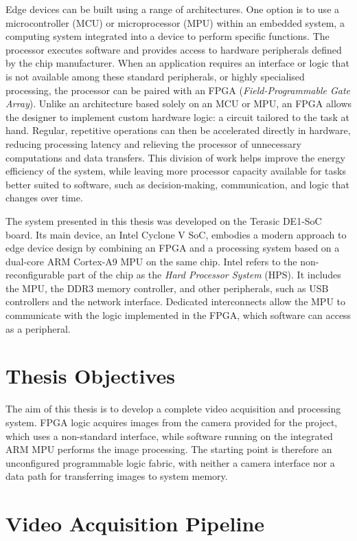 Edge devices can be built using a range of architectures. One option is to use a microcontroller (MCU) or microprocessor (MPU) within an embedded system, a computing system integrated into a device to perform specific functions. The processor executes software and provides access to hardware peripherals defined by the chip manufacturer. When an application requires an interface or logic that is not available among these standard peripherals, or highly specialised processing, the processor can be paired with an FPGA (\emph{Field-Programmable Gate Array}). Unlike an architecture based solely on an MCU or MPU, an FPGA allows the designer to implement custom hardware logic: a circuit tailored to the task at hand. Regular, repetitive operations can then be accelerated directly in hardware, reducing processing latency and relieving the processor of unnecessary computations and data transfers. This division of work helps improve the energy efficiency of the system, while leaving more processor capacity available for tasks better suited to software, such as decision-making, communication, and logic that changes over time.

The system presented in this thesis was developed on the Terasic DE1-SoC board. Its main device, an Intel Cyclone V SoC, embodies a modern approach to edge device design by combining an FPGA and a processing system based on a dual-core ARM Cortex-A9 MPU on the same chip. Intel refers to the non-reconfigurable part of the chip as the \emph{Hard Processor System} (HPS). It includes the MPU, the DDR3 memory controller, and other peripherals, such as USB controllers and the network interface. Dedicated interconnects allow the MPU to communicate with the logic implemented in the FPGA, which software can access as a peripheral.

\section{Thesis Objectives}

The aim of this thesis is to develop a complete video acquisition and processing system. FPGA logic acquires images from the camera provided for the project, which uses a non-standard interface, while software running on the integrated ARM MPU performs the image processing. The starting point is therefore an unconfigured programmable logic fabric, with neither a camera interface nor a data path for transferring images to system memory.

\section{Video Acquisition Pipeline}

